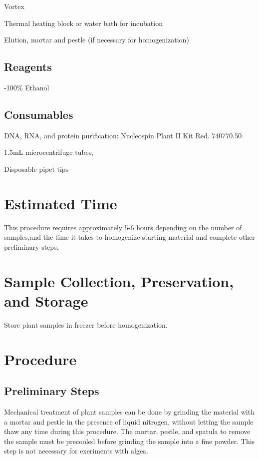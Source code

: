 \documentclass[12pt]{../SOP3_beta}\usepackage[]{graphicx}\usepackage[]{xcolor}
\begin{document}
\NP Vortex

\NP Thermal heating block or water bath for incubation

\NP Elution, mortar and pestle (if necessary for homogenization)

\subsection*{Reagents}

-100\% Ethanol 

\subsection*{Consumables}

\NP DNA, RNA, and protein purification: Nucleospin Plant II Kit Red. 740770.50

\NP 1.5mL microcentrifuge tubes, 

\NP Disposable pipet tips


\section{Estimated Time}

\NP This procedure requires approximately 5-6 hours depending on the number of samples,and the time it takes to homogenize starting material and complete other preliminary steps. 

\section{Sample Collection, Preservation, and Storage}

\NP Store plant samples in freezer before homogenization.

\section{Procedure}

\subsection*{Preliminary Steps}
	 
\NP Mechanical treatment of plant samples can be done by grinding the material with a mortar and pestle in the presence of liquid nitrogen, without letting the sample thaw any time during this procedure. The mortar, pestle, and spatula to remove the sample must be precooled before grinding the sample into a fine powder. This step is not necessary for exeriments with algea.
\end{document}

